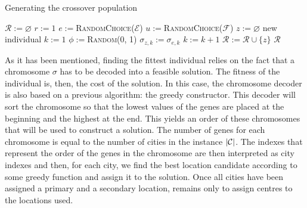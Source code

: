 \begin{algorithm}[H]
    \label{alg:brkga:crossover}
    \DontPrintSemicolon
    
    \caption{Generating the crossover population}
    
     {
        $\mathcal{R} := \varnothing$\;
        $r := 1$\;
         {
            $e := $\textsc{RandomChoice}($\mathcal{E}$)\;
            $u := $\textsc{RandomChoice}($\mathcal{F}$)\;
            $z := \varnothing$ new individual\;
            $k := 1$\;
             {
                $\phi := $\textsc{Random}(0, 1)\;
                 {
                    $\sigma_{z, k} := \sigma_{e, k}$
                }
                $k := k + 1$\;
            }
            $\mathcal{R} := \mathcal{R} \cup \{z\}$\;
        }
        \Return $\mathcal{R}$\;
    }
\end{algorithm}

\hfill

As it has been mentioned, finding the fittest individual relies on the fact that a chromosome
$\sigma$ has to be decoded into a feasible solution. The fitness of the individual is, then,
the cost of the solution. In this case, the chromosome decoder is also based on a previous
algorithm: the greedy constructor. This decoder will sort the chromosome so that the lowest
values of the genes are placed at the beginning and the highest at the end. This yields an
order of these chromosomes that will be used to construct a solution. The number of genes for
each chromosome is equal to the number of cities in the instance $|\mathcal{C}|$. The indexes that
represent the order of the genes in the chromosome are then interpreted as city indexes and
then, for each city, we find the best location candidate according to some greedy function and
assign it to the solution. Once all cities have been assigned a primary and a secondary
location, remains only to assign centres to the locations used.

\hfill

